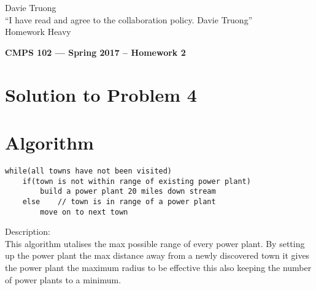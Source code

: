 \documentclass[11pt]{article}
\begin{document}
\begin{text} 
Davie Truong\\
“I have read and agree to the collaboration policy. Davie Truong” \\
Homework Heavy \\
\end{text}


\begin{center}
{\bf\Large CMPS 102 --- Spring 2017 --  Homework 2}
\end{center}

\section*{Solution to Problem 4}

\section*{Algorithm} 
\begin{lstlisting}
while(all towns have not been visited)
	if(town is not within range of existing power plant)
		build a power plant 20 miles down stream
	else	// town is in range of a power plant
		move on to next town
\end{lstlisting}

\begin{text} 
Description:\\
This algorithm utalises the max possible range of every power plant. By setting up the power plant the max distance away from a newly discovered town it gives the power plant the maximum radius to be effective this also keeping the number of power plants to a minimum.
\end{text}
\end{document}
